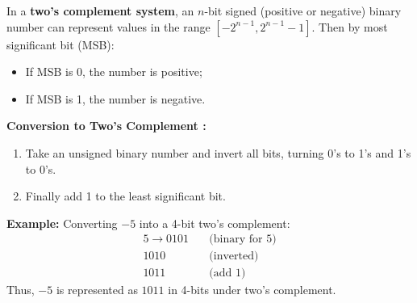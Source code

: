 \begin{theo}
    
    In a \textbf{two's complement system}, an $n$-bit signed (positive or negative) binary number can represent values in the range $[-2^{n-1}, 2^{n-1}-1]$. Then by most significant bit (MSB):
    \begin{itemize}
        \item If MSB is 0, the number is positive;
        \item If MSB is 1, the number is negative.
    \end{itemize}
    \noindent
    \textbf{Conversion to Two's Complement :}
    \begin{enumerate}
        \item Take an unsigned binary number and invert all bits, turning 0's to 1's and 1's to 0's.
        \item Finally add 1 to the least significant bit.
    \end{enumerate}
\end{theo}
\textbf{Example:} Converting $-5$ into a 4-bit two's complement:
    \begin{align*}
        5 \rightarrow 0101 \quad & \text{(binary for 5)} \\
         1010 \quad & \text{(inverted)} \\
         1011 \quad & \text{(add 1)}
    \end{align*}
    Thus, $-5$ is represented as $1011$ in 4-bits under two's complement.

    